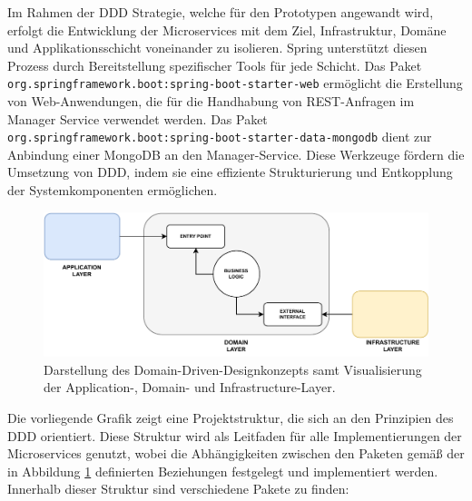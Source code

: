 Im Rahmen der \ac{DDD} Strategie, welche für den Prototypen angewandt wird, erfolgt die Entwicklung der Microservices mit dem Ziel, Infrastruktur, Domäne und Applikationsschicht voneinander zu isolieren. Spring unterstützt diesen Prozess durch Bereitstellung spezifischer Tools für jede Schicht. Das Paket \lstinline{org.springframework.boot:spring-boot-starter-web} ermöglicht die Erstellung von Web-Anwendungen, die für die Handhabung von REST-Anfragen im Manager Service verwendet werden. Das Paket \lstinline{org.springframework.boot:spring-boot-starter-data-mongodb} dient zur Anbindung einer MongoDB an den Manager-Service. Diese Werkzeuge fördern die Umsetzung von \ac{DDD}, indem sie eine effiziente Strukturierung und Entkopplung der Systemkomponenten ermöglichen.

\begin{figure}[H]
    \centering
    \includegraphics[width=14cm]{images/60_implementation/DDD.drawio.pdf}
    \caption[Darstellung des Domain-Driven-Designkonzepts]{Darstellung des Domain-Driven-Designkonzepts samt Visualisierung der Application-, Domain- und Infrastructure-Layer.}
    \label{fig:DDD}
\end{figure}
\newpage
Die vorliegende Grafik zeigt eine Projektstruktur, die sich an den Prinzipien des \ac{DDD} orientiert. Diese Struktur wird als Leitfaden für alle Implementierungen der Microservices genutzt, wobei die Abhängigkeiten zwischen den Paketen gemäß der in Abbildung \ref{fig:DDD} definierten Beziehungen festgelegt und implementiert werden. Innerhalb dieser Struktur sind verschiedene Pakete zu finden:

